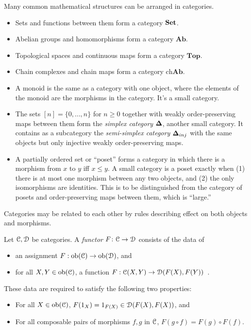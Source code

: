 \begin{example}
Many common mathematical structures can be arranged in categories.
\begin{itemize}
\item Sets and functions between them form a category $\mathbf{Set}$.
\item Abelian groups and homomorphisms form a category $\mathbf{Ab}$.
\item Topological spaces and continuous maps form a category $\mathbf{Top}$.
\item Chain complexes and chain maps form a category $\mathrm{ch}\mathbf{Ab}$.
\item A monoid is the same as a category with one object, where the elements of the monoid are the morphisms in the category. It's a small category.
\item The sets $[n]=\{0,\ldots,n\}$ for $n\geq 0$ together with weakly order-preserving maps between them form the {\em simplex category} ${\mathbf{\Delta}}$, 
another small category. It contains as a subcategory the {\em semi-simplex
category} ${\mathbf{\Delta}}_{inj}$ with the same objects but only injective weakly order-preserving maps.  
\item A partially ordered set or ``poset'' forms a category in which there is a morphism from $x$ to $y$ iff $x\leq y$. A small category is a poset exactly
when (1) there is at most one morphism between any two objects, and
(2) the only isomorphisms are identities. This is to be distinguished from
the category of posets and order-preserving maps between them, which is 
``large.''
\end{itemize}
\end{example}

Categories may be related to each other by rules describing effect on both
objects and morphisms. 
\begin{definition}
Let $\mathcal C,\mathcal D$ be categories. A \emph{functor} $F\colon\mathcal C\to\mathcal D$ consists
of the data of 
\begin{itemize}
\item an assignment  $F:\mathrm{ob}(\mathcal C)\to\mathrm{ob}(\mathcal D)$, and
\item for all $X,Y\in\mathrm{ob}(\mathcal C)$, a function 
$F:\mathcal C(X,Y)\to\mathcal D(F(X),F(Y))$ \,.
\end{itemize}
These data are required to satisfy the following two properties:
\begin{itemize}
\item For all $X\in\mathrm{ob}(\mathcal C)$, $F(1_X)=1_{F(X)}\in\mathcal D(F(X),F(X))$, and
\item For all composable pairs of morphisms $f,g$ in $\mathcal C$, 
$F(g\circ f)=F(g)\circ F(f)$.
\end{itemize}
\end{definition}

